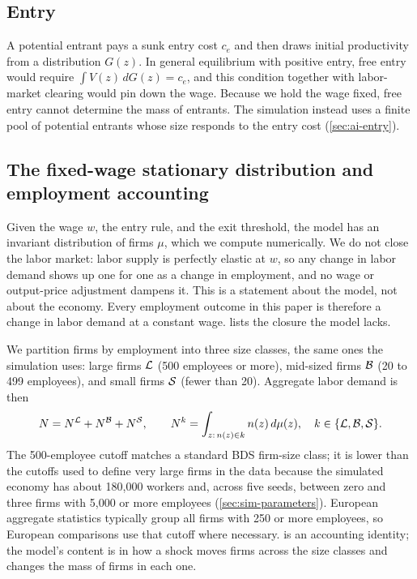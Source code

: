 \subsection{Entry}\label{sec:theory-entry}

A potential entrant pays a sunk entry cost $c_e$ and then draws initial productivity from a distribution $G(z)$.
In general equilibrium with positive entry, free entry would require $\int V(z)\, dG(z) = c_e$, and this condition together with labor-market clearing would pin down the wage.
Because we hold the wage fixed, free entry cannot determine the mass of entrants.
The simulation instead uses a finite pool of potential entrants whose size responds to the entry cost (\cref{sec:ai-entry}).

\subsection{The fixed-wage stationary distribution and employment accounting}\label{sec:theory-equilibrium}

Given the wage $w$, the entry rule, and the exit threshold, the model has an invariant distribution of firms $\mu$, which we compute numerically.
We do not close the labor market: labor supply is perfectly elastic at $w$, so any change in labor demand shows up one for one as a change in employment, and no wage or output-price adjustment dampens it.
This is a statement about the model, not about the economy.
Every employment outcome in this paper is therefore a change in labor demand at a constant wage.
 lists the closure the model lacks.

We partition firms by employment into three size classes, the same ones the simulation uses: large firms $\mathcal{L}$ (500 employees or more), mid-sized firms $\mathcal{B}$ (20 to 499 employees), and small firms $\mathcal{S}$ (fewer than 20).
Aggregate labor demand is then
\begin{equation}\label{eq:employment}
  N = N^{\mathcal{L}} + N^{\mathcal{B}} + N^{\mathcal{S}}, \qquad N^{k} = \int_{z:\, n(z) \in k} n(z)\, d\mu(z), \quad k \in \{\mathcal{L}, \mathcal{B}, \mathcal{S}\}.
\end{equation}
The 500-employee cutoff matches a standard BDS firm-size class; it is lower than the cutoffs used to define very large firms in the data because the simulated economy has about 180,000 workers and, across five seeds, between zero and three firms with 5,000 or more employees (\cref{sec:sim-parameters}).
European aggregate statistics typically group all firms with 250 or more employees, so European comparisons use that cutoff where necessary.
 is an accounting identity; the model's content is in how a shock moves firms across the size classes and changes the mass of firms in each one.

